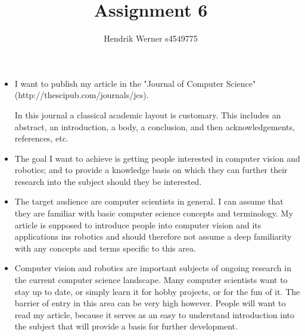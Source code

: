 \documentclass[12pt, a4paper]{article}
\title{Assignment 6}
\author{Hendrik Werner s4549775}
\begin{document}
\maketitle

\begin{itemize}
	\item I want to publish my article in the "Journal of Computer Science" (http://thescipub.com/journals/jcs).

	In this journal a classical academic layout is customary. This includes an abstract, an introduction, a body, a conclusion, and then acknowledgements, references, etc.
	\item The goal I want to achieve is getting people interested in computer vision and robotics; and to provide a knowledge basis on which they can further their research into the subject should they be interested.
	\item The target audience are computer scientists in general. I can assume that they are familiar with basic computer science concepts and terminology. My article is supposed to introduce people into computer vision and its applications ins robotics and should therefore not assume a deep familiarity with any concepts and terms specific to this area.
	\item Computer vision and robotics are important subjects of ongoing research in the current computer science landscape. Many computer scientists want to stay up to date, or simply learn it for hobby projects, or for the fun of it. The barrier of entry in this area can be very high however. People will want to read my article, because it serves as an easy to understand introduction into the subject that will provide a basis for further development.
\end{itemize}
\end{document}
